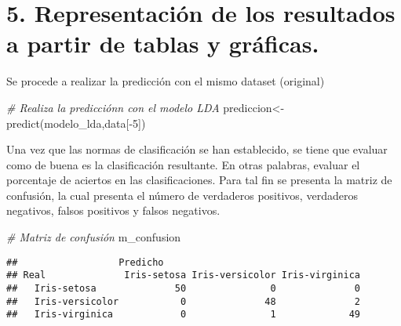 \documentclass[
]{article}
\newenvironment{Shaded}{\begin{snugshade}}{\end{snugshade}}
\newcommand{\AttributeTok}[1]{\textcolor[rgb]{0.77,0.63,0.00}{#1}}
\newcommand{\CommentTok}[1]{\textcolor[rgb]{0.56,0.35,0.01}{\textit{#1}}}
\newcommand{\DecValTok}[1]{\textcolor[rgb]{0.00,0.00,0.81}{#1}}
\newcommand{\FunctionTok}[1]{\textcolor[rgb]{0.00,0.00,0.00}{#1}}
\newcommand{\NormalTok}[1]{#1}
\newcommand{\OtherTok}[1]{\textcolor[rgb]{0.56,0.35,0.01}{#1}}
\newcommand{\SpecialCharTok}[1]{\textcolor[rgb]{0.00,0.00,0.00}{#1}}
\newcommand{\StringTok}[1]{\textcolor[rgb]{0.31,0.60,0.02}{#1}}
\begin{document}
\hypertarget{representaciuxf3n-de-los-resultados-a-partir-de-tablas-y-gruxe1ficas.}{%
\section{5. Representación de los resultados a partir de tablas y
gráficas.}\label{representaciuxf3n-de-los-resultados-a-partir-de-tablas-y-gruxe1ficas.}}

Se procede a realizar la predicción con el mismo dataset (original)

\begin{Shaded}
\begin{Highlighting}[]
\CommentTok{\# Realiza la predicciónn con el modelo LDA}
\NormalTok{prediccion}\OtherTok{\textless{}{-}}\FunctionTok{predict}\NormalTok{(modelo\_lda,data[}\SpecialCharTok{{-}}\DecValTok{5}\NormalTok{])}
\end{Highlighting}
\end{Shaded}

Una vez que las normas de clasificación se han establecido, se tiene que
evaluar como de buena es la clasificación resultante. En otras palabras,
evaluar el porcentaje de aciertos en las clasificaciones. Para tal fin
se presenta la matriz de confusión, la cual presenta el número de
verdaderos positivos, verdaderos negativos, falsos positivos y falsos
negativos.

\begin{Shaded}
\end{Shaded}

\begin{Shaded}
\begin{Highlighting}[]
\CommentTok{\# Matriz de confusión}
\NormalTok{m\_confusion}
\end{Highlighting}
\end{Shaded}

\begin{verbatim}
##                  Predicho
## Real              Iris-setosa Iris-versicolor Iris-virginica
##   Iris-setosa              50               0              0
##   Iris-versicolor           0              48              2
##   Iris-virginica            0               1             49
\end{verbatim}
\end{document}
